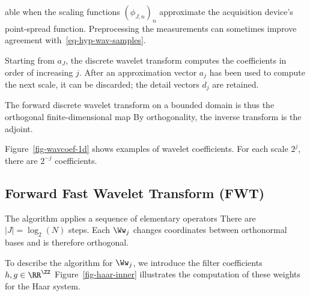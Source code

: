 able when the scaling functions $(\phi_{J,n})_n$ approximate the acquisition device's point-spread function. Preprocessing the measurements can sometimes improve agreement with~\eqref{eq-hyp-wav-samples}.

Starting from $a_J$, the discrete wavelet transform computes the coefficients
in order of increasing $j$. After an approximation vector $a_j$ has been used to compute the next scale, it can be discarded; the detail vectors $d_j$ are retained.

The forward discrete wavelet transform on a bounded domain is thus the orthogonal finite-dimensional map
By orthogonality, the inverse transform is the adjoint.


Figure~\ref{fig-wavcoef-1d} shows examples of wavelet coefficients. For each scale $2^j$, there are $2^{-j}$ coefficients.



   
\subsection{Forward Fast Wavelet Transform (FWT)}

The algorithm applies a sequence of elementary operators
There are $|J|=\log_2(N)$ steps. Each $\Ww_j$ changes coordinates between orthonormal bases and is therefore orthogonal.

To describe the algorithm for $\Ww_j$, we introduce the filter coefficients $h,g \in \RR^\ZZ$
Figure~\ref{fig-haar-inner} illustrates the computation of these weights for the Haar system.


